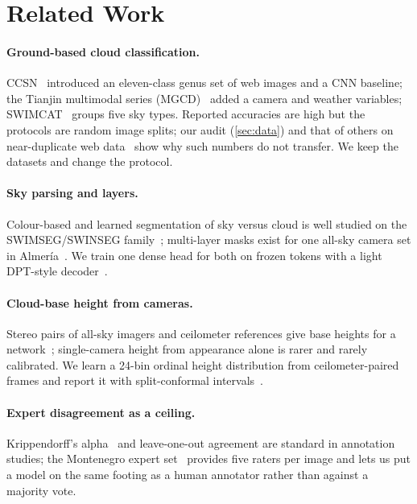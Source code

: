 \section{Related Work}
\label{sec:related}

\paragraph{Ground-based cloud classification.} CCSN~\cite{zhang2018cloudnet} introduced an eleven-class genus set
of web images and a CNN baseline; the Tianjin multimodal series (MGCD)~\cite{liu2020mgcd} added a camera and
weather variables; SWIMCAT~\cite{dev2017colorbased} groups five sky types. Reported accuracies are high but the
protocols are random image splits; our audit (\cref{sec:data}) and that of others on near-duplicate web
data~\cite{barz2020duplicates} show why such numbers do not transfer. We keep the datasets and change the protocol.

\paragraph{Sky parsing and layers.} Colour-based and learned segmentation of sky versus cloud is well studied on the
SWIMSEG/SWINSEG family~\cite{dev2017colorbased}; multi-layer masks exist for one all-sky camera set in
Almer\'ia~\cite{almeria2025}. We train one dense head for both on frozen tokens with a light DPT-style
decoder~\cite{ranftl2021dpt}.

\paragraph{Cloud-base height from cameras.} Stereo pairs of all-sky imagers and ceilometer references give
base heights for a network~\cite{blum2021cloudheight,eye2sky}; single-camera height from appearance alone is rarer and rarely
calibrated. We learn a 24-bin ordinal height distribution from ceilometer-paired frames and report it with
split-conformal intervals~\cite{vovk2022conformal,angelopoulos2023conformal}.

\paragraph{Expert disagreement as a ceiling.} Krippendorff's alpha~\cite{krippendorff2018content} and
leave-one-out agreement are standard in annotation studies; the Montenegro expert set~\cite{montenegro2025}
provides five raters per image and lets us put a model on the same footing as a human annotator rather than
against a majority vote.

